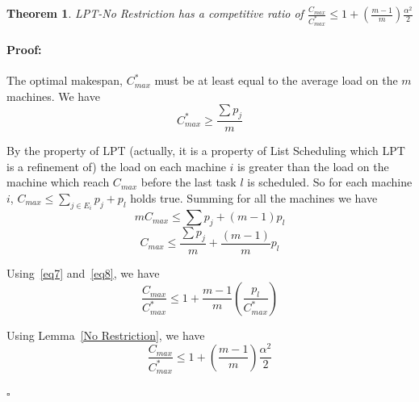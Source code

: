 \documentclass[12pt]{article}
\theoremstyle{mystyle}
\newtheorem{theorem}{Theorem}
\newenvironment{myproof}{\paragraph{Proof:}}{\hfill$\square$}
\begin{document}
   \begin{theorem}
     \label{th:strategy2}
     \textit{LPT-No Restriction} has a competitive ratio of
     $\frac{C_{max}}{C_{max}^{*}} \leq 1 + (\frac{m-1}{m})
     \frac{\alpha^{2}}{2}$
   \end{theorem} 
   
   \begin{myproof}
     The optimal makespan, $C_{max}^{*}$ must be at least equal to the
     average load on the $m$ machines. We have
     \begin{equation}\label{eq7}
       C_{max}^{*}\geq\frac{\sum p_j}{m}
     \end{equation}
   
     By the property of LPT (actually, it is a property of List
     Scheduling which LPT is a refinement of) the load on each machine
     $i$ is greater than the load on the machine which reach $C_{max}$
     before the last task $l$ is scheduled. So for each machine $i$,
     $C_{max} \leq \sum_{j \in E_i}^{}{p_j} + p_l$ holds true.  Summing
     for all the machines we have
     \begin{equation}\nonumber
       mC_{max} \leq  \sum {p_j} + (m-1)p_l
     \end{equation}
     \begin{equation}\label{eq8}
       C_{max} \leq  \frac{\sum {p_j}}{m} + \frac{(m-1)}{m}p_l
     \end{equation}
     
     Using~\ref{eq7} and~\ref{eq8}, we have
     \begin{equation}\nonumber
       \frac{C_{max}}{C_{max}^{*}} \leq 1 + {\frac{m-1}{m}}\left(\frac{p_l}{C_{max}^{*}}\right)
     \end{equation}
     
     Using Lemma~\ref{No Restriction}, we have 
     \begin{equation}\nonumber
       \frac{C_{max}}{C_{max}^{*}} \leq 1 + \left(\frac{m-1}{m}\right)\frac{\alpha^{2}}{2}
     \end{equation}
   
   \end{myproof}  
   
\end{document}
